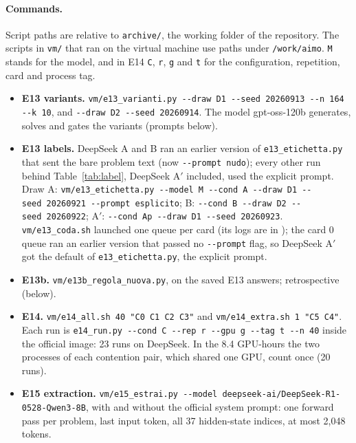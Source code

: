 \paragraph{Commands.} Script paths are relative to \texttt{archive/}, the working folder of the repository. The scripts in \texttt{vm/} that ran on the virtual machine use paths under \texttt{/work/aimo}. \texttt{M} stands for the model, and in E14 \texttt{C}, \texttt{r}, \texttt{g} and \texttt{t} for the configuration, repetition, card and process tag.
\begin{itemize}
\item \textbf{E13 variants.} \texttt{vm/e13\_varianti.py -{}-draw~D1 -{}-seed~20260913 -{}-n~164 -{}-k~10}, and \texttt{-{}-draw~D2 -{}-seed~20260914}. The model gpt-oss-120b generates, solves and gates the variants (prompts below).
\item \textbf{E13 labels.} DeepSeek A and B ran an earlier version of \texttt{e13\_etichetta.py} that sent the bare problem text (now \texttt{-{}-prompt~nudo}); every other run behind Table~\ref{tab:label}, DeepSeek A$'$ included, used the explicit prompt. Draw A: \texttt{vm/e13\_etichetta.py -{}-model~M -{}-cond~A -{}-draw~D1 -{}-seed~20260921 -{}-prompt~esplicito}; B: \texttt{-{}-cond~B -{}-draw~D2 -{}-seed~20260922}; A$'$: \texttt{-{}-cond~Ap -{}-draw~D1 -{}-seed~20260923}. \texttt{vm/e13\_coda.sh} launched one queue per card (its logs are in ); the card 0 queue ran an earlier version that passed no \texttt{-{}-prompt} flag, so DeepSeek A$'$ got the default of \texttt{e13\_etichetta.py}, the explicit prompt.
\item \textbf{E13b.} \texttt{vm/e13b\_regola\_nuova.py}, on the saved E13 answers; retrospective (below).
\item \textbf{E14.} \texttt{vm/e14\_all.sh 40 "C0 C1 C2 C3"} and \texttt{vm/e14\_extra.sh 1 "C5 C4"}. Each run is \texttt{e14\_run.py -{}-cond~C -{}-rep~r -{}-gpu~g -{}-tag~t -{}-n~40} inside the official image: 23 runs on DeepSeek. In the 8.4 GPU-hours the two processes of each contention pair, which shared one GPU, count once (20 runs).
\item \textbf{E15 extraction.} \texttt{vm/e15\_estrai.py -{}-model~deepseek-ai/DeepSeek-R1-0528-Qwen3-8B}, with and without the official system prompt: one forward pass per problem, last input token, all 37 hidden-state indices, at most 2,048 tokens.

\end{itemize}
